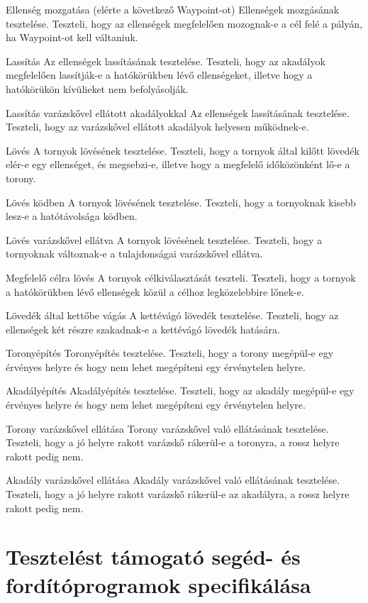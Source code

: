 \teszteset
{Ellenség mozgatása (elérte a következő Waypoint-ot)}
{Ellenségek mozgásának tesztelése.}
{Teszteli, hogy az ellenségek megfelelően mozognak-e a cél felé a pályán, ha Waypoint-ot kell váltaniuk.}

\teszteset
{Lassítás}
{Az ellenségek lassításának tesztelése.}
{Teszteli, hogy az akadályok megfelelően lassítják-e a hatókörükben lévő ellenségeket, illetve hogy a hatókörükön kívülieket nem befolyásolják.}

\teszteset
{Lassítás varázskővel ellátott akadályokkal}
{Az ellenségek lassításának tesztelése.}
{Teszteli, hogy az varázskővel ellátott akadályok helyesen működnek-e.}

\teszteset
{Lövés}
{A tornyok lövésének tesztelése.}
{Teszteli, hogy a tornyok által kilőtt lövedék elér-e egy ellenséget, és megsebzi-e, illetve hogy a megfelelő időközönként lő-e a torony.}

\teszteset
{Lövés ködben}
{A tornyok lövésének tesztelése.}
{Teszteli, hogy a tornyoknak kisebb lesz-e a hatótávolsága ködben.}

\teszteset
{Lövés varázskővel ellátva}
{A tornyok lövésének tesztelése.}
{Teszteli, hogy a tornyoknak változnak-e a tulajdonságai varázskővel ellátva.}

\teszteset
{Megfelelő célra lövés}
{A tornyok célkiválasztását teszteli.}
{Teszteli, hogy a tornyok a hatókörükben lévő ellenségek közül a célhoz legközelebbire lőnek-e.}

\teszteset
{Lövedék által kettőbe vágás}
{A kettévágó lövedék tesztelése.}
{Teszteli, hogy az ellenségek két részre szakadnak-e a kettévágó lövedék hatására.}

\teszteset
{Toronyépítés}
{Toronyépítés tesztelése.}
{Teszteli, hogy a torony megépül-e egy érvényes helyre és hogy nem lehet megépíteni egy érvénytelen helyre.}

\teszteset
{Akadályépítés}
{Akadályépítés tesztelése.}
{Teszteli, hogy az akadály megépül-e egy érvényes helyre és hogy nem lehet megépíteni egy érvénytelen helyre.}

\teszteset
{Torony varázskővel ellátása}
{Torony varázskővel való ellátásának tesztelése.}
{Teszteli, hogy a jó helyre rakott varázskő rákerül-e a toronyra, a rossz helyre rakott pedig nem.}

\teszteset
{Akadály varázskővel ellátása}
{Akadály varázskővel való ellátásának tesztelése.}
{Teszteli, hogy a jó helyre rakott varázskő rákerül-e az akadályra, a rossz helyre rakott pedig nem.}

\section{Tesztelést támogató segéd- és fordítóprogramok specifikálása}

